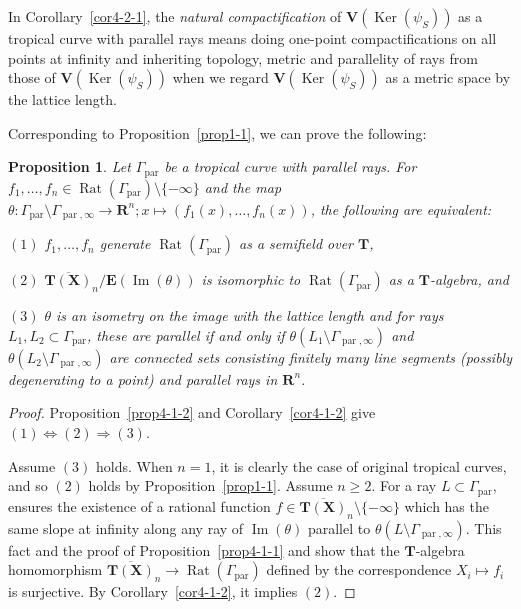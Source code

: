 \documentclass[a4paper,12pt]{amsart}
\newtheorem{prop}[dfn]{Proposition}
\def\Gamma{\varGamma}
\begin{document}
In Corollary~\ref{cor4-2-1}, the \textit{natural compactification} of $\boldsymbol{V}(\operatorname{Ker}(\psi_S))$ as a tropical curve with parallel rays means doing one-point compactifications on all points at infinity and inheriting topology, metric and parallelity of rays from those of $\boldsymbol{V}(\operatorname{Ker}(\psi_S))$ when we regard $\boldsymbol{V}(\operatorname{Ker}(\psi_S))$ as a metric space by the lattice length.

Corresponding to Proposition~\ref{prop1-1}, we can prove the following:

\begin{prop}
    \label{prop4-2-2}
Let $\Gamma_{\operatorname{par}}$ be a tropical curve with parallel rays.
For $f_1, \ldots, f_n \in \operatorname{Rat}(\Gamma_{\operatorname{par}}) \setminus \{ -\infty \}$ and the map $\theta : \Gamma_{\operatorname{par}} \setminus \Gamma_{\operatorname{par}, \infty} \to \boldsymbol{R}^n; x \mapsto (f_1(x), \ldots, f_n(x))$, the following are equivalent:

$(1)$ $f_1, \ldots, f_n$ generate $\operatorname{Rat}(\Gamma_{\operatorname{par}})$ as a semifield over $\boldsymbol{T}$,

$(2)$ $\overline{\boldsymbol{T}(\boldsymbol{X})}_n / \boldsymbol{E}(\operatorname{Im}(\theta))$ is isomorphic to $\operatorname{Rat}(\Gamma_{\operatorname{par}})$ as a $\boldsymbol{T}$-algebra, and

$(3)$ $\theta$ is an isometry on the image with the lattice length and for rays $L_1, L_2 \subset \Gamma_{\operatorname{par}}$, these are parallel if and only if $\theta(L_1 \setminus \Gamma_{\operatorname{par}, \infty})$ and $\theta(L_2 \setminus \Gamma_{\operatorname{par}, \infty})$ are connected sets consisting finitely many line segments (possibly degenerating to a point) and parallel rays in $\boldsymbol{R}^n$.
\end{prop}

\begin{proof}
Proposition~\ref{prop4-1-2} and Corollary~\ref{cor4-1-2} give $(1) \Longleftrightarrow (2) \Longrightarrow (3)$.

Assume $(3)$ holds.
When $n = 1$, it is clearly the case of original tropical curves, and so $(2)$ holds by Proposition~\ref{prop1-1}.
Assume $n \ge 2$.
For a ray $L \subset \Gamma_{\operatorname{par}}$, \cite[the proof of Lemma~3.15]{JuAe5} ensures the existence of a rational function $f \in \overline{\boldsymbol{T}(\boldsymbol{X})}_n \setminus \{ -\infty \}$ which has the same slope at infinity along any ray of $\operatorname{Im}(\theta)$ parallel to $\theta(L \setminus \Gamma_{\operatorname{par}, \infty})$.
This fact and the proof of Proposition~\ref{prop4-1-1} and \cite[Lemmas~3.16 and 3.17]{JuAe5} show that the $\boldsymbol{T}$-algebra homomorphism $\overline{\boldsymbol{T}(\boldsymbol{X})}_n \to \operatorname{Rat}(\Gamma_{\operatorname{par}})$ defined by the correspondence $X_i \mapsto f_i$ is surjective.
By Corollary~\ref{cor4-1-2}, it implies $(2)$.
\end{proof}
\end{document}
